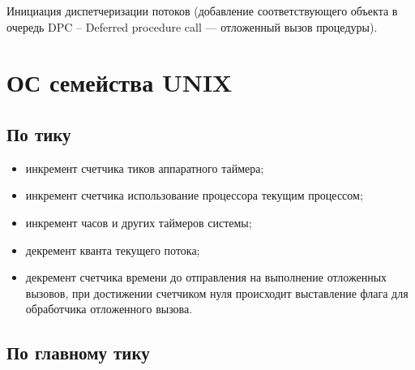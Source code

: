 Инициация диспетчеризации потоков (добавление соответствующего объекта в очередь DPC -- Deferred procedure call — отложенный вызов процедуры).



\section{ОС семейства UNIX} %
\subsection*{По тику}

\begin{itemize}[label=---]
	\item инкремент счетчика тиков аппаратного таймера;
	\item инкремент счетчика использование процессора текущим процессом; %
	\item инкремент часов и других таймеров системы;
	\item декремент кванта текущего потока;
	\item декремент счетчика времени до отправления на выполнение отложенных вызовов, при достижении счетчиком нуля происходит выставление флага для обработчика отложенного вызова.
\end{itemize}

\subsection*{По главному тику}

